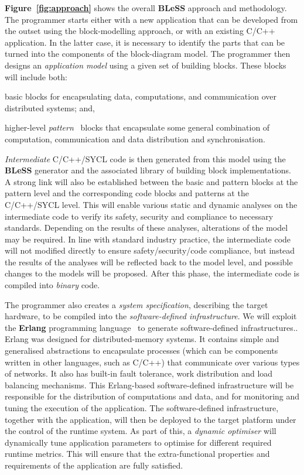 \documentclass[a4paper,11pt]{article}
\newcommand{\project}[1]{\textbf{#1}\xspace}
\newcommand{\BLESS}{\project{BLeSS}}
\newcommand{\TheProject}{\BLESS}
\begin{document}
\textbf{Figure~\ref{fig:approach}} shows the overall \TheProject{} approach and
methodology. The programmer starts either with a new application that can be developed from the outset using the block-modelling approach, or with
an existing C/C++ application.  In the latter case, it is necessary to identify the parts that can be
turned into the components of the block-diagram model. 
The programmer then designs an \emph{application model} using a given set of building blocks. These blocks will include both:
\begin{inparaenum}[i)]
\item
basic blocks for encapsulating data, computations, and communication over distributed systems; and,
\item
higher-level \emph{pattern}~\cite{RPL} blocks that encapsulate some general combination of computation, communication and data distribution and synchronisation.
\end{inparaenum}
\emph{Intermediate} C/C++/SYCL code is then generated from this model using
the \TheProject{} generator and the associated library of
building block implementations.
A strong link will also be established between the basic and pattern blocks at the pattern level and the corresponding code blocks and patterns at the C/C++/SYCL level.
This will enable various static and dynamic analyses on the intermediate
code to verify its safety, security and compliance to necessary
standards. Depending on the results of these analyses, alterations of the
model may be required.  In line with standard industry practice, 
the intermediate code will not modified directly to ensure
safety/security/code compliance, but instead  the results of the
analyses will be reflected back to the model level,
and possible changes to the models will be proposed. After this phase, the intermediate code
is compiled into \emph{binary} code.

The programmer also creates a \emph{system specification}, describing the target hardware, to be compiled into the
\emph{software-defined infrastructure}. We will exploit the \textbf{Erlang} programming language~\cite{Cesarini:2009} to generate software-defined infrastructures.. 
Erlang was designed for distributed-memory systems.
It contains simple and generalised abstractions to encapsulate processes (which can be components written in other languages, such as C/C++) 
that communicate over various types of networks. It also has built-in fault tolerance, work distribution and load balancing mechanisms. 
This Erlang-based software-defined infrastructure will be responsible for
the distribution of computations and data, and for monitoring and tuning the execution of the application. 
The  software-defined infrastructure, together with
the application, will then be deployed to the target platform under the control of
the runtime system. As part of this, a \emph{dynamic optimiser}
will dynamically tune application parameters to optimise for different
required runtime metrics.  This will ensure that the extra-functional
properties and requirements of the application are fully satisfied.
\end{document}
